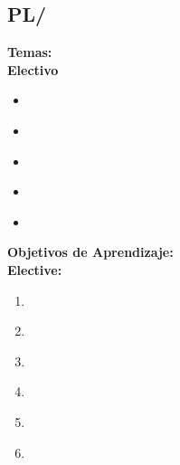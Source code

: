 \subsection{PL/\PLTypeSystems}\label{sec:BOK:PLTypeSystems}
\noindent \textbf{Temas:}\\
\noindent \textbf{Electivo}
\begin{itemize}
	\item \PLTypeSystemsTopicCompositional\label{sec:BOK:PLTypeSystemsTopicCompositional}
	\item \PLTypeSystemsTopicType\label{sec:BOK:PLTypeSystemsTopicType}
	\item \PLTypeSystemsTopicTypeSafety\label{sec:BOK:PLTypeSystemsTopicTypeSafety}
	\item \PLTypeSystemsTopicTypeInference\label{sec:BOK:PLTypeSystemsTopicTypeInference}
	\item \PLTypeSystemsTopicStatic\label{sec:BOK:PLTypeSystemsTopicStatic}
\end{itemize}


\noindent \textbf{Objetivos de Aprendizaje:}\\
\noindent \textbf{Elective:}
\begin{enumerate}
	\setcounter{enumi}{0}
	\item \PLTypeSystemsLODefineAPrecisely\xspace[\PLTypeSystemsLODefineAPreciselyLevel]\label{sec:BOK:PLTypeSystemsLODefineAPrecisely}
	\item \PLTypeSystemsLOForVarious\xspace[\PLTypeSystemsLOForVariousLevel]\label{sec:BOK:PLTypeSystemsLOForVarious}
	\item \PLTypeSystemsLOPrecisely\xspace[\PLTypeSystemsLOPreciselyLevel]\label{sec:BOK:PLTypeSystemsLOPrecisely}
	\item \PLTypeSystemsLOProveType\xspace[\PLTypeSystemsLOProveTypeLevel]\label{sec:BOK:PLTypeSystemsLOProveType}
	\item \PLTypeSystemsLOImplementAType\xspace[\PLTypeSystemsLOImplementATypeLevel]\label{sec:BOK:PLTypeSystemsLOImplementAType}
	\item \PLTypeSystemsLOExplainHowAndAlgorithms\xspace[\PLTypeSystemsLOExplainHowAndAlgorithmsLevel]\label{sec:BOK:PLTypeSystemsLOExplainHowAndAlgorithms}
\end{enumerate}


